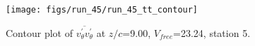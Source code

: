 \begin{figure}[H]
\centering
\texttt{[image: figs/run\_45/run\_45\_tt\_contour]}
\caption{Contour plot of $\overline{v_{\theta}^{\prime} v_{\theta}^{\prime}}$ at $z/c$=9.00, $V_{free}$=23.24, station 5.}
\label{fig:run_45_tt_contour}
\end{figure}


